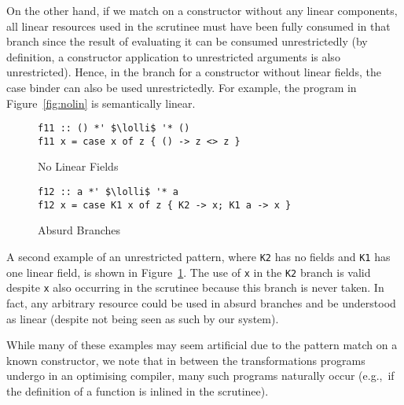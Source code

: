 \documentclass[acmsmall,review,screen]{acmart}
\newcommand{\incode}[1]{\lstinline{#1}}
\newcommand{\lolli}{\multimap}
\begin{document}
On the other hand, if we match on a constructor without any linear components,
all linear resources used in the scrutinee must have been fully consumed in
that branch since the result of evaluating it can be consumed unrestrictedly
(by definition, a constructor application to unrestricted arguments is also
unrestricted).
%
Hence, in the branch for a constructor without linear fields, the case
binder can also be used unrestrictedly. For example, the program in
Figure~\ref{fig:nolin} is semantically linear.
%
\begin{figure}[h]
 \begin{minipage}{0.5\textwidth}
\begin{notyet}
\begin{lstlisting}
f11 :: () *' $\lolli$ '* ()
f11 x = case x of z { () -> z <> z }
\end{lstlisting}
\end{notyet}
\vspace{-0.5cm}
\caption{No Linear Fields\label{fig:nolin}}
\end{minipage}%
\begin{minipage}{0.5\textwidth}
\begin{limitation}
\begin{lstlisting}
f12 :: a *' $\lolli$ '* a
f12 x = case K1 x of z { K2 -> x; K1 a -> x }
\end{lstlisting}
\end{limitation}
\vspace{-0.5cm}
\caption{Absurd Branches\label{fig:absurd}}
\end{minipage}
\end{figure}
%
A second example of an unrestricted pattern, where \incode{K2} has no fields
and \incode{K1} has one linear field, is shown in Figure~\ref{fig:absurd}.
The use of \incode{x} in the \incode{K2} branch is valid despite \incode{x}
also occurring in the scrutinee because this branch is never taken. In fact,
any arbitrary resource could be used in absurd branches and be understood as
linear (despite not being seen as such by our system).

While many of these examples may seem artificial due to the pattern match on a
known constructor, we note that in between the transformations programs
undergo in an optimising compiler, many such programs naturally occur (e.g.,~if
the definition of a function is inlined in the scrutinee).
%
\end{document}
